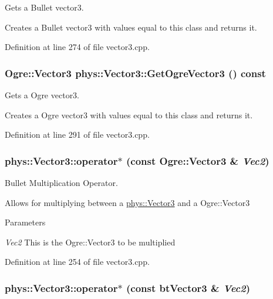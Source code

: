 Gets a Bullet vector3. 

Creates a Bullet vector3 with values equal to this class and returns it. 

Definition at line 274 of file vector3.cpp.

\hypertarget{classphys_1_1Vector3_a17265d86a74139398d310b56ba7e89b8}{
\subsubsection[{GetOgreVector3}]{\setlength{\rightskip}{0pt plus 5cm}Ogre::Vector3 phys::Vector3::GetOgreVector3 () const}}
\label{d5/d6a/classphys_1_1Vector3_a17265d86a74139398d310b56ba7e89b8}


Gets a Ogre vector3. 

Creates a Ogre vector3 with values equal to this class and returns it. 

Definition at line 291 of file vector3.cpp.

\hypertarget{classphys_1_1Vector3_a34014be39219a1ad3d4808b9614ac80d}{
\subsubsection[{operator$\ast$}]{ phys::Vector3::operator$\ast$ (const Ogre::Vector3 \& {\em Vec2})}}
\label{d5/d6a/classphys_1_1Vector3_a34014be39219a1ad3d4808b9614ac80d}


Bullet Multiplication Operator. 

Allows for multiplying between a \hyperlink{classphys_1_1Vector3}{phys::Vector3} and a Ogre::Vector3 
\begin{DoxyParams}{Parameters}
\item[{\em Vec2}]This is the Ogre::Vector3 to be multiplied \end{DoxyParams}


Definition at line 254 of file vector3.cpp.

\hypertarget{classphys_1_1Vector3_a59f8b8d5c15f4b047100480ad26ba092}{
\subsubsection[{operator$\ast$}]{ phys::Vector3::operator$\ast$ (const btVector3 \& {\em Vec2})}}
\label{d5/d6a/classphys_1_1Vector3_a59f8b8d5c15f4b047100480ad26ba092}



